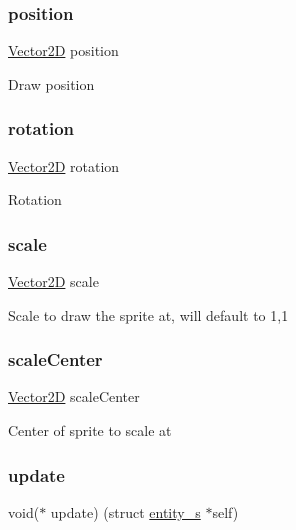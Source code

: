 \subsubsection{\texorpdfstring{position}{position}}
{\footnotesize\ttfamily \hyperlink{struct_vector2_d}{Vector2D} position}

Draw position \mbox{\label{structentity__s_ac4e0ffa54c436c5dad6ca9481266f9ed}} 
\subsubsection{\texorpdfstring{rotation}{rotation}}
{\footnotesize\ttfamily \hyperlink{struct_vector2_d}{Vector2D} rotation}

Rotation \mbox{\label{structentity__s_a1b187f4d1f81894380925e9de933801a}} 
\subsubsection{\texorpdfstring{scale}{scale}}
{\footnotesize\ttfamily \hyperlink{struct_vector2_d}{Vector2D} scale}

Scale to draw the sprite at, will default to 1,1 \mbox{\label{structentity__s_a8ff0fe80de1fcc51fee6f1d766e9de8b}} 
\subsubsection{\texorpdfstring{scale\+Center}{scaleCenter}}
{\footnotesize\ttfamily \hyperlink{struct_vector2_d}{Vector2D} scale\+Center}

Center of sprite to scale at \mbox{\label{structentity__s_ae4dad0223ba78dddff3177bd20960ff2}} 
\subsubsection{\texorpdfstring{update}{update}}
{\footnotesize\ttfamily void($\ast$ update) (struct \hyperlink{structentity__s}{entity\+\_\+s} $\ast$self)}


